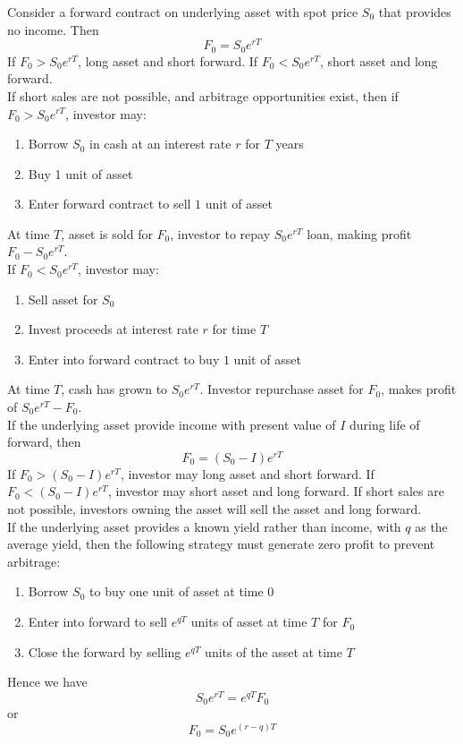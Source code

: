 \documentclass[a4paper,oneside,openany]{book}
\begin{document}
Consider a forward contract on underlying asset with spot price $S_0$ that provides no income. Then
\begin{equation*}
F_0 = S_0 e^{rT} \nonumber
\end{equation*}
If $F_0 > S_0 e^{rT}$, long asset and short forward. If $F_0 < S_0 e^{rT}$, short asset and long forward.\\
If short sales are not possible, and arbitrage opportunities exist, then if $F_0 > S_0 e^{rT}$, investor may:
\begin{enumerate}[label=\arabic*.]
\setlength{\itemsep}{0pt}
\item Borrow $S_0$ in cash at an interest rate $r$ for $T$ years
\item Buy 1 unit of asset
\item Enter forward contract to sell $1$ unit of asset
\end{enumerate}
At time $T$, asset is sold for $F_0$, investor to repay $S_0 e^{rT}$ loan, making profit $F_0 - S_0 e^{rT}$.\\
If $F_0 < S_0 e^{rT}$, investor may:
\begin{enumerate}[label=\arabic*.]
\setlength{\itemsep}{0pt}
\item Sell asset for $S_0$
\item Invest proceeds at interest rate $r$ for time $T$
\item Enter into forward contract to buy $1$ unit of asset
\end{enumerate}
At time $T$, cash has grown to $S_0 e^{rT}$. Investor repurchase asset for $F_0$, makes profit of $S_0 e^{rT} - F_0$.\\

If the underlying asset provide income with present value of $I$ during life of forward, then
\begin{equation*}
F_0 = (S_0 - I)e^{rT} \nonumber
\end{equation*}
If $F_0 > (S_0 - I)e^{rT}$, investor may long asset and short forward. If $F_0 < (S_0 - I)e^{rT}$, investor may short asset and long forward. If short sales are not possible, investors owning the asset will sell the asset and long forward.\\

If the underlying asset provides a known yield rather than income, with $q$ as the average yield, then the following strategy must generate zero profit to prevent arbitrage:
\begin{enumerate}[label=\arabic*.]
\setlength{\itemsep}{0pt}
\item Borrow $S_0$ to buy one unit of asset at time $0$
\item Enter into forward to sell $e^{qT}$ units of asset at time $T$ for $F_0$
\item Close the forward by selling $e^{qT}$ units of the asset at time $T$
\end{enumerate}
Hence we have
\begin{equation*}
S_0 e^{rT} = e^{qT} F_0 \nonumber 
\end{equation*}
or
\begin{equation*}
F_0 = S_0 e^{(r-q)T} \nonumber
\end{equation*}
\end{document}

